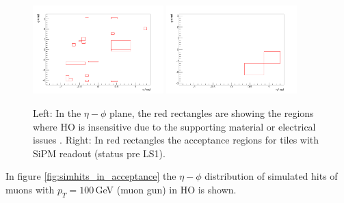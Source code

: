			\begin{figure}[htbp]
				\centering
				\includegraphics[width=0.45\textwidth]{Figures/erdogan/deadregions.png}
				\includegraphics[width=0.45\textwidth]{Figures/erdogan/sipmregions.png}
				\caption{Left: In the $\eta-\phi$ plane, the red rectangles are showing the regions where HO is insensitive due to the supporting material or electrical issues \cite{JINST}. Right: In red
				rectangles the acceptance regions for tiles with SiPM readout (status pre LS1).}
				\label{fig:ho_acceptance}
			\end{figure}
			In figure \ref{fig:simhits_in_acceptance} the $\eta-\phi$ distribution of simulated hits of muons with $p_T = 100$\,GeV (muon gun) in HO is shown.

